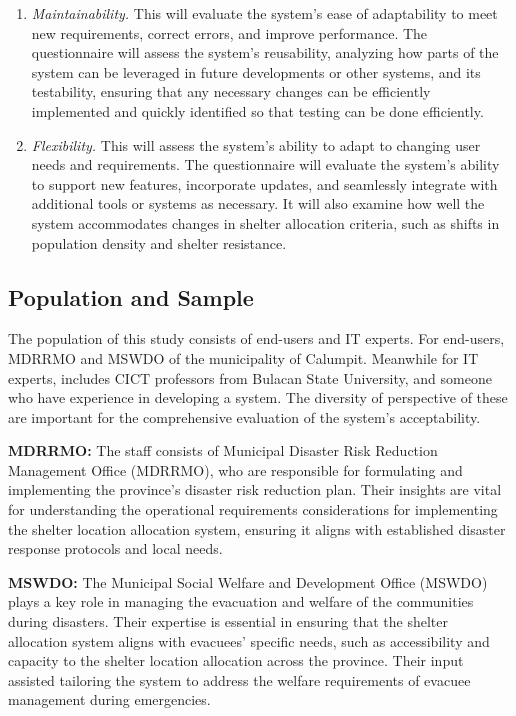 \begin{enumerate}
		\item \textit{Maintainability.} This will evaluate the system's ease of adaptability to meet new requirements, correct errors, and improve performance. The questionnaire will assess the system's reusability, analyzing how parts of the system can be leveraged in future developments or other systems, and its testability, ensuring that any necessary changes can be efficiently implemented and quickly identified so that testing can be done efficiently. 
		
		\item \textit{Flexibility.} This will assess the system’s ability to adapt to changing user needs and requirements. The questionnaire will evaluate the system's ability to support new features, incorporate updates, and seamlessly integrate with additional tools or systems as necessary. It will also examine how well the system accommodates changes in shelter allocation criteria, such as shifts in population density and shelter resistance.
	\end{enumerate}
	

\subsection{Population and Sample}
	The population of this study consists of end-users and IT experts. For end-users,  MDRRMO and MSWDO of the municipality of Calumpit. Meanwhile for IT experts, includes CICT professors from Bulacan State University, and someone who have experience in developing a system.  The diversity of perspective of these are important for the comprehensive evaluation of the system’s acceptability.
	
	\textbf{MDRRMO:} The staff consists of Municipal Disaster Risk Reduction Management Office (MDRRMO), who are responsible for formulating and implementing the province's disaster risk reduction plan.  Their insights are vital for understanding the operational requirements considerations for implementing the shelter location allocation system, ensuring it aligns with established disaster response protocols and local needs.
	
	\textbf{MSWDO:} The Municipal Social Welfare and Development Office (MSWDO) plays a key role in managing the evacuation and welfare of the communities during disasters. Their expertise is essential in ensuring that the shelter allocation system aligns with evacuees' specific needs, such as accessibility and capacity to the shelter location allocation across the province. Their input assisted tailoring the system to address the welfare requirements of evacuee management during emergencies.
	
